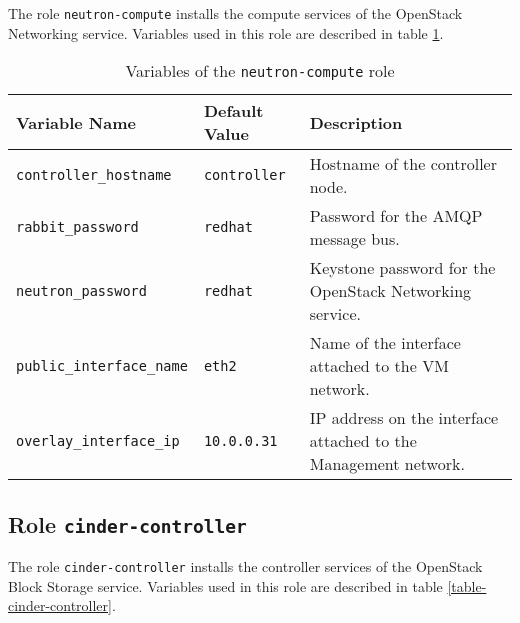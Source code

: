 The role \texttt{neutron-compute} installs the compute services of the OpenStack Networking service. Variables used in this role are described in table \ref{table-neutron-compute}.

\begin{table}[!h]
  \centering
  \begin{tabular}{|l|l|p{5cm}|}\hline
    Variable Name & Default Value & Description \\\hline
    \texttt{controller\_hostname} & \texttt{controller} & Hostname of the controller node. \\\hline
    \texttt{rabbit\_password} & \texttt{redhat} & Password for the AMQP message bus. \\\hline
    \texttt{neutron\_password} & \texttt{redhat} & Keystone password for the OpenStack Networking service. \\\hline
    \texttt{public\_interface\_name} & \texttt{eth2} & Name of the interface attached to the VM network. \\\hline
    \texttt{overlay\_interface\_ip} & \texttt{10.0.0.31} & IP address on the interface attached to the Management network. \\\hline

  \end{tabular}
\caption{Variables of the \texttt{neutron-compute} role}
\label{table-neutron-compute}
\end{table}

\subsection{Role \texttt{cinder-controller}}

The role \texttt{cinder-controller} installs the controller services of the OpenStack Block Storage service. Variables used in this role are described in table \ref{table-cinder-controller}.

